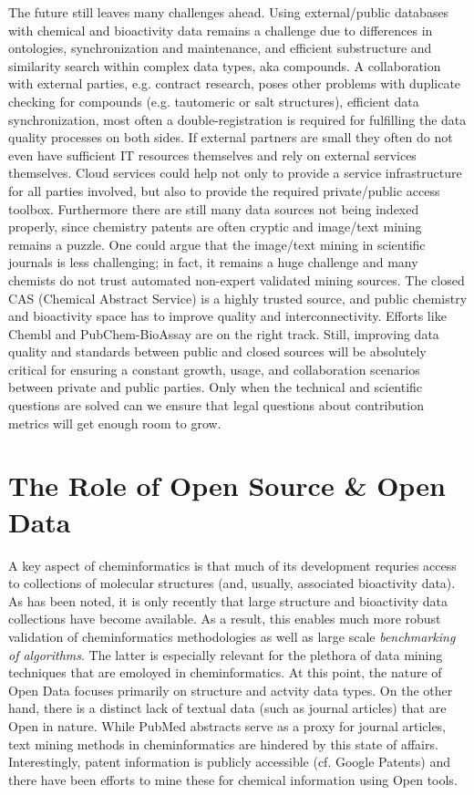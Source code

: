 \documentclass{sig-alternate}
\begin{document}
The future still leaves many challenges ahead. Using external/public databases
with chemical and bioactivity data remains a challenge due to differences in
ontologies, synchronization and maintenance, and efficient
substructure and similarity search within complex data types, aka compounds. A
collaboration with external parties, e.g. contract research, poses other
problems with duplicate checking for compounds (e.g. tautomeric or salt
structures), efficient data synchronization, most often a double-registration is
required for fulfilling the data quality processes on both sides. If external
partners are small they often do not even have sufficient IT resources
themselves and rely on external services themselves. Cloud services could help
not only to provide a service infrastructure for all parties involved,
but also to provide the required private/public access toolbox. Furthermore
there are still many data sources not being indexed properly, since chemistry
patents are often cryptic and image/text mining remains a puzzle. One could
argue that the image/text mining in scientific journals is less challenging; in
fact, it remains a huge challenge and many chemists do not trust automated
non-expert validated mining sources. The closed CAS (Chemical Abstract Service)
is a highly trusted source, and public chemistry and bioactivity space has to
improve quality and interconnectivity. Efforts like Chembl and PubChem-BioAssay
are on the right track. Still, improving data quality and standards between
public and closed sources will be absolutely critical for ensuring a constant
growth, usage, and collaboration scenarios between private and public parties.
Only when the technical and scientific questions are solved can we ensure that
legal questions about contribution metrics will get enough room to grow.

\section{The Role of Open Source \& Open Data}
\label{sec:role-open-source}

A key aspect of cheminformatics is that much of its development
requries access to collections of molecular structures (and, usually,
associated bioactivity data). As has been noted, it is only recently
that large structure and bioactivity data collections have become
available. As a result, this enables much more robust validation of
cheminformatics methodologies as well as large scale \emph{benchmarking of
algorithms}. The latter is especially relevant for the plethora of
data mining techniques that are emoloyed in cheminformatics. At this
point, the nature of Open Data focuses primarily on structure and
actvity data types. On the other hand, there is a distinct lack of
textual data (such as journal articles) that are Open in nature. While
PubMed abstracts serve as a proxy for journal articles, text mining
methods in cheminformatics are hindered by this state of affairs.
Interestingly, patent information is publicly accessible (cf. Google
Patents) and there have been efforts to mine these for chemical
information using Open tools.
\end{document}
